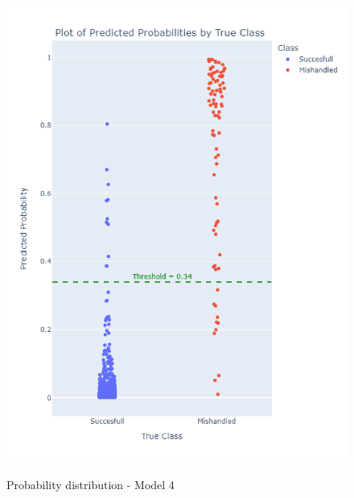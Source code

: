 \documentclass[12pt]{article}
\begin{document}
\begin{figure}
\begin{minipage}[c]{0.4\linewidth}
    \includegraphics[width=1\textwidth]{Probability_distribution_Model 4.png}\\
    \caption{Probability distribution - Model 4}
\end{minipage}%
\hfill
\begin{minipage}[c]{0.4\linewidth}

\end{minipage}
\end{figure}
\end{document}
